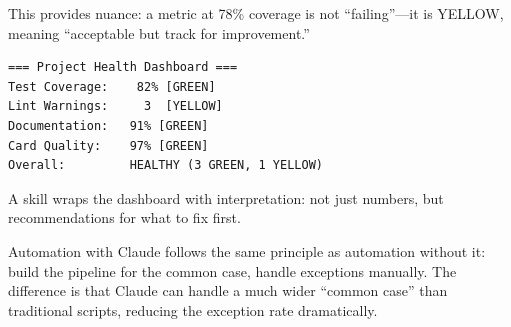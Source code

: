 This provides nuance: a metric at 78\% coverage is not ``failing''---it is
YELLOW, meaning ``acceptable but track for improvement.''

\begin{verbatim}
=== Project Health Dashboard ===
Test Coverage:    82% [GREEN]
Lint Warnings:     3  [YELLOW]
Documentation:   91% [GREEN]
Card Quality:    97% [GREEN]
Overall:         HEALTHY (3 GREEN, 1 YELLOW)
\end{verbatim}

A skill wraps the dashboard with interpretation:
not just numbers, but recommendations for what to fix first.

\begin{keyinsight}
Automation with Claude follows the same principle as automation without it:
build the pipeline for the common case, handle exceptions manually.
The difference is that Claude can handle a much wider ``common case''
than traditional scripts, reducing the exception rate dramatically.
\end{keyinsight}
